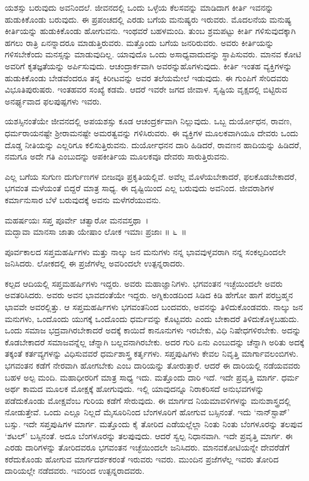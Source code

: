 ಯಶಸ್ಸು ಬರುವುದು ಅವನಿಂದಲೆ. ಜೀವನದಲ್ಲಿ ಒಂದು ಒಳ್ಳೆಯ ಕೆಲಸವನ್ನು ಮಾಡಿದಾಗ ಕೀರ್ತಿ ಇವನನ್ನು ಹುಡುಕಿಕೊಂಡು ಬರುವುದು. ಈ ಪ್ರಪಂಚದಲ್ಲಿ ಎರಡು ಬಗೆಯ ಮನುಷ್ಯರು ಇರುವರು. ಮೊದಲನೆಯ ಮನುಷ್ಯ ಕೀರ್ತಿಯನ್ನು ಹುಡುಕಿಕೊಂಡು ಹೋಗುವನು. ಇಂಥವರೆ ಬಹಳಮಂದಿ. ತುಂಬ ಶ್ರಮಪಟ್ಟು ಕೀರ್ತಿ ಗಳಿಸುವುದಕ್ಕಾಗಿ ಹಗಲು ರಾತ್ರಿ ಏನನ್ನಾದರೂ ಮಾಡುತ್ತಿರುವರು. ಮತ್ತೊಂದು ಬಗೆಯ ಜನರಿರುವರು. ಅವರು ಕೀರ್ತಿಯನ್ನು ಗಳಿಸಬೇಕೆಂದು ಮನಸ್ಸನ್ನು ಮಾಡುವುದಿಲ್ಲ. ಯಾವುದೊ ಒಂದು ಅಸಾಧ್ಯವಾದುದನ್ನು ಸ್ಥಾಪಿಸುವರು. ಮಾನವ ಕೋಟಿ ಅವರಿಗೆ ಕೃತಜ್ಞತೆಯನ್ನು ಅರ್ಪಿಸುವುದು. ಆಚಂದ್ರಾರ್ಕವಾಗಿ ಅವರನ್ನು\break ಹೊಗಳುವುದು. ಕೀರ್ತಿ ಇಂತಹ ವ್ಯಕ್ತಿಗಳನ್ನು ಹುಡುಕಿಕೊಂಡು ಬೇಡವೆಂದರೂ ತನ್ನ ಕಿರೀಟವನ್ನು ಅವರ ತಲೆಯಮೇಲೆ ಇಡುವುದು. ಈ ಗುಂಪಿಗೆ ಸೇರಿದವರು ವಿಭೂತಿಪುರುಷರು. ಇಂತಹವರ ಸಂಖ್ಯೆ ಕಡಮೆ. ಆದರೆ ಇವರೇ ಜಗದ ಜೀವಾಳ. ಸೃಷ್ಟಿಯ ವೃಕ್ಷದಲ್ಲಿ ಬಿಟ್ಟಿರುವ ಅನರ್ಘ್ಯವಾದ ಫಲಪುಷ್ಪಗಳು ಇವರು.

ಯಶಸ್ಸಿನಂತೆಯೇ ಜೀವನದಲ್ಲಿ ಅಪಯಶಸ್ಸು ಕೂಡ ಆಚಂದ್ರರ್ಕವಾಗಿ ನಿಲ್ಲುವುದು. ಒಬ್ಬ ದುರ್ಯೋಧನ, ರಾವಣ, ಧರ್ಮರಾಯನಷ್ಟೇ ಶ‍್ರೀರಾಮನಷ್ಟೇ ಅಮರತ್ವವನ್ನು ಗಳಿಸಿರುವರು. ಈ ವ್ಯಕ್ತಿಗಳ ಮೂಲಕವಾಗಿಯೂ ದೇವರು ಒಂದು ದೊಡ್ಡ ನೀತಿಯನ್ನು ಎಲ್ಲರಿಗೂ ಕಲಿಸುತ್ತಿರುವನು. ದುರ್ಯೋಧನನ ದಾರಿ ಹಿಡಿದರೆ, ರಾವಣನ ಹಾದಿಯನ್ನು ಹಿಡಿದರೆ, ನಮಗೂ ಅದೇ ಗತಿ ಎಂಬುದನ್ನು ಅಪಕೀರ್ತಿಯ ಮೂಲಕವೂ ದೇವರು ಸಾರುತ್ತಿರುವನು.

ಎಲ್ಲ ಬಗೆಯ ಸುಗುಣ ದುರ್ಗುಣಗಳ ಬೀಜವೂ ಪ್ರಕೃತಿಯಲ್ಲಿವೆ. ಅವೆಲ್ಲ ಮೊಳೆಯ\-ಬೇಕಾದರೆ, ಫಲಕೊಡಬೇಕಾದರೆ, ಭಗವಂತ ಮಳೆಯಂತೆ ಬಿದ್ದರೆ ಮಾತ್ರ ಸಾಧ್ಯ. ಈ ದೃಷ್ಟಿಯಿಂದ ಎಲ್ಲ ಬರುವುದು ಅವನಿಂದ. ಜೀವರಾಶಿಗಳ ಕರ್ಮಾನುಸಾರ ಬೆಳೆ ಬರುವುದಕ್ಕೆ ಅವನು ಮಳೆಗರೆಯುವನು.

\begin{shloka}
ಮಹರ್ಷಯಃ ಸಪ್ತ ಪೂರ್ವೇ ಚತ್ವಾರೋ ಮನವಸ್ತಥಾ~।\\ಮದ್ಭಾವಾ ಮಾನಸಾ ಜಾತಾ ಯೇಷಾಂ ಲೋಕ ಇಮಾಃ ಪ್ರಜಾಃ \hfill॥ ೬~॥
\end{shloka}

\begin{artha}
ಪೂರ್ವಕಾಲದ ಸಪ್ತಮಹರ್ಷಿಗಳು ಮತ್ತು ನಾಲ್ಕು ಜನ ಮನುಗಳು ನನ್ನ ಭಾವವುಳ್ಳವರಾಗಿ ನನ್ನ ಸಂಕಲ್ಪದಿಂದಲೇ ಜನಿಸಿದರು. ಲೋಕದಲ್ಲಿ ಈ ಪ್ರಜೆಗಳೆಲ್ಲ ಅವರಿಂದಲೇ ಉತ್ಪನ್ನರಾದರು.
\end{artha}

ಕಲ್ಪದ ಆದಿಯಲ್ಲಿ ಸಪ್ತಮಹರ್ಷಿಗಳು ಇದ್ದರು. ಅವರು ಮಹಾಜ್ಞಾನಿಗಳು. ಭಗವಂತನ ಇಚ್ಛೆಯಿಂದಲೇ ಅವರು ಅವತರಿಸಿದರು. ಅವರು ಅವನ ಭಾವದಂತೆಯೇ ಇದ್ದರು. ಅಗ್ನಿಕುಂಡದಿಂದ ಸಿಡಿದ ಕಿಡಿ ಹೇಗೋ ಹಾಗೆ ಪರಬ್ರಹ್ಮನ ಭಾವವೇ ಅವರಲ್ಲಿತ್ತು. ಆ ಸಪ್ತಮಹರ್ಷಿಗಳು ಭಗವಂತನಿಂದ ಬಂದವರು, ಅವನನ್ನು ತಿಳಿದುಕೊಂಡವರು. ನಾಲ್ಕು ಜನ ಮನುಗಳು, ಒಂದೊಂದು ಯುಗಕ್ಕೆ ಒಂದೊಂದು ಧರ್ಮವನ್ನು ಕೊಟ್ಟವರು ಎಂದು ಬೇಕಾದರೆ ತಿಳಿದುಕೊಳ್ಳಬಹುದು. ಒಂದು ಸಮಾಜ ಭದ್ರವಾಗಿರಬೇಕಾದರೆ ಅದಕ್ಕೆ ಕಾಯಿದೆ ಕಾನೂನುಗಳು ಇರಬೇಕು, ವಿಧಿ ನಿಷೇಧಗಳಿರಬೇಕು. ಅದನ್ನು ಕೊಡಬೇಕಾದರೆ ಸಮಾಜವನ್ನೆಲ್ಲ ಚೆನ್ನಾಗಿ ಬಲ್ಲವನಾಗಿರಬೇಕು. ಅದರ ಗುರಿ ಏನು ಎಂಬುದನ್ನು ಚೆನ್ನಾಗಿ ಅರಿತು ಅದಕ್ಕೆ ತಕ್ಕಂತೆ ಕರ್ತವ್ಯಗಳನ್ನು ವಿಧಿಸುವವರೆ ಧರ್ಮಶಾಸ್ತ್ರ ಕರ್ತೃಗಳು. ಸಪ್ತಪುಷಿಗಳು ಕೇವಲ ನಿವೃತ್ತಿ ಮಾರ್ಗಾವಲಂಬಿಗಳು. ಭಗವಂತನ ಕಡೆಗೆ ನೇರವಾಗಿ ಹೋಗಬೇಕು ಎಂಬ ದಾರಿಯನ್ನು ತೋರುತ್ತಾರೆ. ಆದರೆ ಈ ದಾರಿಯಲ್ಲಿ ನಡೆಯವವರು ಬಹಳ ಅಲ್ಪ ಮಂದಿ. ಮಹಾಧೀರರಿಗೆ ಮಾತ್ರ ಸಾಧ್ಯ ಇದು. ಮತ್ತೊಂದು ದಾರಿ ಇದೆ. ಇದೇ ಪ್ರವೃತ್ತಿ ಮಾರ್ಗ. ಧರ್ಮ ಅರ್ಥ ಕಾಮದ ಮೂಲಕ ಮೋಕ್ಷಕ್ಕೆ ಹೋಗುವುದು. ಇಲ್ಲಿ ಯಾವುದನ್ನೂ ನಿರಾಕರಿಸದೆ ಅನುಭವಗಳನ್ನು ಪಡೆದುಕೊಂಡು ಮೋಕ್ಷವೆಂಬ ಗುರಿಯ ಕಡೆಗೆ ಸೇರುವುದು. ಈ ಮಾರ್ಗದ ನಿಯಮಾವಳಿಗಳನ್ನು ಮನುಶಾಸ್ತ್ರದಲ್ಲಿ ನೋಡುತ್ತೇವೆ. ಒಂದು ಎಲ್ಲೂ ನಿಲ್ಲದೆ ಮೈಸೂರಿನಿಂದ ಬೆಂಗಳೂರಿಗೆ ಹೋಗುವ ಬಸ್ಸಿನಂತೆ. ಇದು ‘ನಾನ್​\-ಸ್ಟಾಪ್​’ ಬಸ್ಸು. ಇದೇ ಸಪ್ತಪುಷಿಗಳ ಮಾರ್ಗ. ಮತ್ತೊಂದು ಕೈ ತೋರಿದ ಎಡೆಯಲ್ಲೆಲ್ಲಾ ನಿಂತು ನಿಂತು ಬೆಂಗಳೂರನ್ನು ತಲಪುವ ‘ಶಟಲ್​’ ಬಸ್ಸಿನಂತೆ. ಅದೂ ಬೆಂಗಳೂರನ್ನು ತಲಪುವುದು. ಆದರೆ ಸ್ವಲ್ಪ ನಿಧಾನವಾಗಿ. ಇದೇ ಪ್ರವೃತ್ತಿ ಮಾರ್ಗ. ಈ ಎರಡು ದಾರಿಗಳನ್ನು ತೋರಿದವರೂ ಭಗವಂತನ ಇಚ್ಛೆಯಿಂದಲೇ ಜನಿಸಿದರು. ಮಾನವಕೋಟಿಯನ್ನೇ ದೇವರೆಡೆಗೆ ಕರೆದುಕೊಂಡು ಹೋಗುವ ಮಾರ್ಗದರ್ಶಕರಂತೆ ಇರುವರು ಇವರು. ಮುಂದಿನ ಪ್ರಜೆಗಳೆಲ್ಲ ಇವರು ತೋರಿದ ದಾರಿಯಲ್ಲೇ ನಡೆದವರು. ಇವರಿಂದ ಉತ್ಪನ್ನರಾದವರು.

